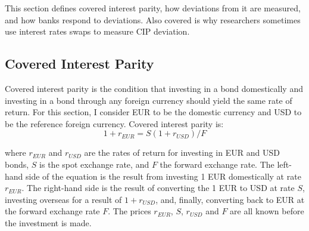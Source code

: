 

% 


This section defines covered interest parity, how deviations from it are measured, and how banks respond to deviations.  Also covered is why researchers sometimes use interest rates swaps to measure CIP deviation.  

\subsection{Covered Interest Parity}

Covered interest parity is the condition that investing in a bond domestically and investing in a bond through any foreign currency should yield the same rate of return.  For this section, I consider EUR to be the domestic currency and USD to be the reference foreign currency.  Covered interest parity is:
\begin{equation} 
  \label{CIP-eqn} 
1 + r_{EUR} = S(1 + r_{USD})/F
\end{equation}

\noindent where $r_{EUR}$ and $r_{USD}$ are the rates of return for investing in EUR and USD bonds, $S$ is the spot exchange rate, and $F$ the forward exchange rate.  The left-hand side of the equation is the result from investing 1 EUR domestically at rate $r_{EUR}$.  The right-hand side is the result of converting the 1 EUR to USD at rate $S$, investing overseas for a result of $1+r_{USD}$, and, finally, converting back to EUR at the forward exchange rate $F$.  The prices $r_{EUR}$, $S$, $r_{USD}$ and $F$ are all known before the investment is made.  

